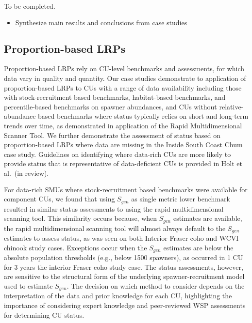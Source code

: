 \documentclass[11pt]{book}
\begin{document}
To be completed.
\begin{itemize}

\item
  Synthesize main results and conclusions from case studies
\end{itemize}
\hypertarget{proportion-based-lrps-1}{%
\subsection{Proportion-based LRPs}\label{proportion-based-lrps-1}}

Proportion-based LRPs rely on CU-level benchmarks and assessments, for which data vary in quality and quantity. Our case studies demonstrate to application of proportion-based LRPs to CUs with a range of data availability including those with stock-recruitment based benchmarks, habitat-based benchmarks, and percentile-based benchmarks on spawner abundances, and CUs without relative-abundance based benchmarks where status typically relies on short and long-term trends over time, as demonstrated in application of the Rapid Multidimensional Scanner Tool. We further demonstrate the assessment of status based on proportion-based LRPs where data are missing in the Inside South Coast Chum case study. Guidelines on identifying where data-rich CUs are more likely to provide status that is representative of data-deficient CUs is provided in Holt et al.~(in review).

For data-rich SMUs where stock-recruitment based benchmarks were available for component CUs, we found that using \(S_{gen}\) as single metric lower benchmark resulted in similar status assessments to using the rapid multidimensional scanning tool. This similarity occurs because, when \(S_{gen}\) estimates are available, the rapid multidimensional scanning tool will almost always default to the \(S_{gen}\) estimates to assess status, as was seen on both Interior Fraser coho and WCVI chinook study cases. Exceptions occur when the \(S_{gen}\) estimates are below the absolute population thresholds (e.g., below 1500 spawners), as occurred in 1 CU for 3 years the interior Fraser coho study case. The status assessments, however, are sensitive to the structural form of the underlying spawner-recruitment model used to estimate \(S_{gen}\). The decision on which method to consider depends on the interpretation of the data and prior knowledge for each CU, highlighting the importance of considering expert knowledge and peer-reviewed WSP assessments for determining CU status.
\end{document}
